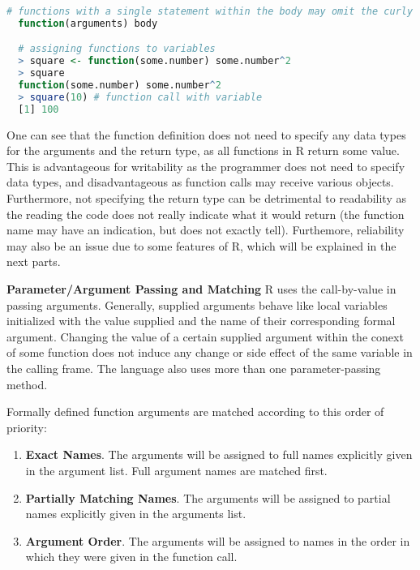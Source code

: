 \documentclass[12pt]{article}
\begin{document}
\begin{lstlisting}[language=R ]
  # functions with a single statement within the body may omit the curly braces
  function(arguments) body

  # assigning functions to variables
  > square <- function(some.number) some.number^2
  > square
  function(some.number) some.number^2
  > square(10) # function call with variable
  [1] 100
\end{lstlisting}

One can see that the function definition does not need to specify any data types for the arguments and the return type, as all functions in R return some value. This is advantageous for writability as the programmer does not need to specify data types, and disadvantageous as function calls may receive various objects. Furthermore, not specifying the return type can be detrimental to readability as the reading the code does not really indicate what it would return (the function name may have an indication, but does not exactly tell). Furthemore, reliability may also be an issue due to some features of R, which will be explained in the next parts.

\textbf{Parameter/Argument Passing and Matching} R uses the call-by-value in passing arguments. Generally, supplied arguments behave like local variables initialized with the value supplied and the name of their corresponding formal argument. Changing the value of a certain supplied argument within the conext of some function does not induce any change or side effect of the same variable in the calling frame. The language also uses more than one parameter-passing method.

Formally defined function arguments are matched according to this order of priority:
\begin{enumerate}
\item \textbf{Exact Names}. The arguments will be assigned to full names explicitly given in the argument list. Full argument names are matched first.
\item \textbf{Partially Matching Names}. The arguments will be assigned to partial names explicitly given in the arguments list.
\item \textbf{Argument Order}. The arguments will be assigned to names in the order in which they were given in the function call.
\end{enumerate}
\end{document}
